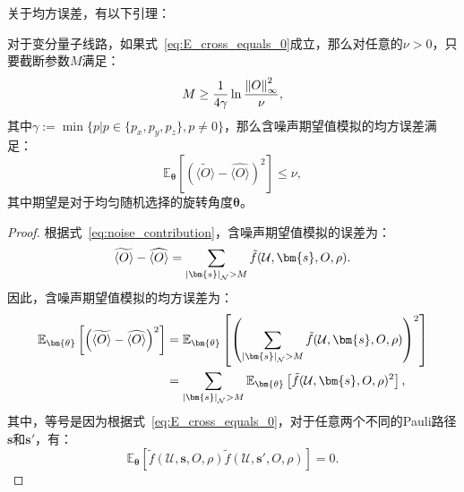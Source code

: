 关于均方误差，有以下引理：
\begin{lemma}\label{lemma:MSE_l}
    对于变分量子线路，如果式~\eqref{eq:E_cross_equals_0}成立，那么对任意的$\nu > 0$，只要截断参数$M$满足：
    \begin{equation}
        M\geq\frac{1}{4\gamma}\ln{\frac{\norm{O}_\infty^2}{\nu}},
    \end{equation}
    其中$\gamma:=\min\{p|{p \in \{p_x,p_y,p_z\},p\neq 0}\}$，那么含噪声期望值模拟的均方误差满足：
    \begin{equation}
        \mathbb{E}_{\bm{\theta}}\left[\left(\widetilde{\langle O\rangle}-\widehat{\langle O\rangle}\right)^2\right]\leq\nu,
    \end{equation}
    其中期望是对于均匀随机选择的旋转角度$\bm{\theta}$。
\end{lemma}
\begin{proof}
    根据式~\eqref{eq:noise_contribution}，含噪声期望值模拟的误差为：
    \begin{equation}
        \widetilde{\langle O\rangle}-\widehat{\langle O\rangle}=\sum_{\abs{\bm{s}}_{\mathcal{N}}>M}\tilde{f}(\mathcal{U},\bm{s},O,\rho).
    \end{equation}
    因此，含噪声期望值模拟的均方误差为：
    \begin{equation}
        \begin{aligned}
            \mathbb{E}_{\bm{\theta}}\left[\left(\widetilde{\langle O\rangle}-\widehat{\langle O\rangle}\right)^2\right]&=\mathbb{E}_{\bm{\theta}}\left[\left(\sum_{\abs{\bm{s}}_{\mathcal{N}}>M}\tilde{f}(\mathcal{U},\bm{s},O,\rho)\right)^2\right]\\
            &=\sum_{\abs{\bm{s}}_{\mathcal{N}}>M}\mathbb{E}_{\bm{\theta}}\left[\tilde{f}(\mathcal{U},\bm{s},O,\rho)^2\right],
        \end{aligned}
    \end{equation}
    其中，等号是因为根据式~\eqref{eq:E_cross_equals_0}，对于任意两个不同的Pauli路径$\bm{s}$和$\bm{s}'$，有：
    \begin{equation}
        \mathbb{E}_{\bm{\theta}}\left[\tilde{f}(\mathcal{U},\bm{s},O,\rho)\tilde{f}(\mathcal{U},\bm{s}',O,\rho)\right]=0.
    \end{equation}
    

\end{proof}
